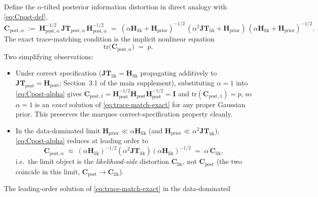 \documentclass[11pt]{article}
\begin{document}
Define the $\alpha$-tilted posterior information distortion in direct analogy
with \eqref{eq:Cpost-def},
\begin{equation}
\mathbf C_{\mathrm{post},\alpha}
\;:=\;
\mathbf H_{\mathrm{post},\alpha}^{-1/2}\,
\mathbf{JT}_{\mathrm{post},\alpha}\,
\mathbf H_{\mathrm{post},\alpha}^{-1/2}
\;=\;
(\alpha\mathbf H_{\mathrm{lik}} + \mathbf H_{\mathrm{prior}})^{-1/2}\,
(\alpha^2\mathbf{JT}_{\mathrm{lik}} + \mathbf H_{\mathrm{prior}})\,
(\alpha\mathbf H_{\mathrm{lik}} + \mathbf H_{\mathrm{prior}})^{-1/2}.
\label{eq:Cpost-alpha}
\end{equation}
The exact trace-matching condition is the implicit nonlinear equation
\begin{equation}
\mathrm{tr}\!\bigl(\mathbf C_{\mathrm{post},\alpha}\bigr) \;=\; p.
\label{eq:trace-match-exact}
\end{equation}
Two simplifying observations:
\begin{itemize}
\item Under correct specification ($\mathbf{JT}_{\mathrm{lik}}
= \mathbf H_{\mathrm{lik}}$ propagating additively to $\mathbf{JT}_{\mathrm{post}}
= \mathbf H_{\mathrm{post}}$; Section~3.1 of the main supplement), substituting
$\alpha = 1$ into \eqref{eq:Cpost-alpha} gives
$\mathbf C_{\mathrm{post},1} = \mathbf H_{\mathrm{post}}^{-1/2}
\mathbf H_{\mathrm{post}} \mathbf H_{\mathrm{post}}^{-1/2} = \mathbf I$
and $\mathrm{tr}(\mathbf C_{\mathrm{post},1}) = p$, so $\alpha = 1$ is an
\emph{exact} solution of \eqref{eq:trace-match-exact} for any proper Gaussian
prior. This preserves the marquee correct-specification property cleanly.
\item In the data-dominated limit
$\mathbf H_{\mathrm{prior}} \ll \alpha\mathbf H_{\mathrm{lik}}$ (and
$\mathbf H_{\mathrm{prior}} \ll \alpha^2\mathbf{JT}_{\mathrm{lik}}$),
\eqref{eq:Cpost-alpha} reduces at leading order to
\begin{equation}
\mathbf C_{\mathrm{post},\alpha}
\;\approx\;
(\alpha\mathbf H_{\mathrm{lik}})^{-1/2}(\alpha^2\mathbf{JT}_{\mathrm{lik}})
(\alpha\mathbf H_{\mathrm{lik}})^{-1/2}
\;=\;
\alpha\,\mathbf C_{\mathrm{lik}},
\label{eq:Cpost-alpha-asymptote}
\end{equation}
i.e.\ the limit object is the \emph{likelihood-side} distortion
$\mathbf C_{\mathrm{lik}}$, not $\mathbf C_{\mathrm{post}}$ (the two coincide
in this limit, $\mathbf C_{\mathrm{post}} \to \mathbf C_{\mathrm{lik}}$).
\end{itemize}
The leading-order solution of \eqref{eq:trace-match-exact} in the data-dominated
\end{document}
